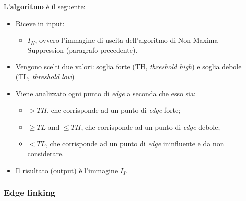 \documentclass[a4paper]{article}
\begin{document}
	\noindent
	L'\textbf{\underline{algoritmo}} è il seguente:
	\begin{itemize}
		\item Riceve in input:
		\begin{itemize}
			\item $I_{N}$, ovvero l'immagine di uscita dell'algoritmo di Non-Maxima Suppression (paragrafo precedente).
		\end{itemize}
	
		\item Vengono scelti due valori: soglia forte (TH, \emph{threshold high}) e soglia debole (TL, \emph{threshold low})
		
		\item Viene analizzato ogni punto di \emph{edge} a seconda che esso sia:
		\begin{itemize}
			\item $> TH$, che corrisponde ad un punto di \emph{edge} forte;
			\item $\ge TL$ and $\le TH$, che corrisponde ad un punto di \emph{edge} debole;
			\item $< TL$, che corrisponde ad un punto di \emph{edge} ininfluente e da non considerare.
		\end{itemize}
	
		\item Il risultato (output) è l'immagine $I_{I}$.
	\end{itemize}\newpage

	\subsubsection{Edge linking}
	
\end{document}
